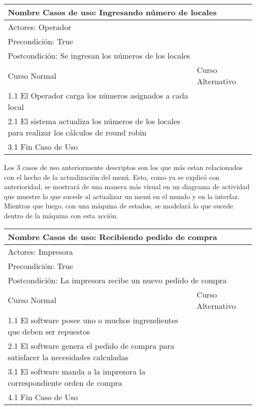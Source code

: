 \documentclass[a4paper,10pt]{article}
\begin{document}
\bigskip

\begin{center}
\begin{tabularx}{14cm}{|X|X|}
\hline
\multicolumn{2}{|l|}{Nombre Casos de uso: Ingresando n\'umero de locales}\\
\hline
\multicolumn{2}{|l|}{Actores: Operador}\\
\hline
\multicolumn{2}{|l|}{Precondici\'on: True}\\
\hline
\multicolumn{2}{|l|}{Postcondici\'on: Se ingresan los n\'umeros de los locales}\\
\hline
Curso Normal & Curso Alternativo\\
\hline
1.1 El Operador carga los n\'umeros asignados a cada local & 
\\
\hline
2.1 El sistema actualiza los n\'umeros de los locales para realizar los c\'alculos de round robin & 
\\
\hline
3.1 Fin Caso de Uso &
\\
\hline
\end{tabularx}
\end{center}

\bigskip

Los 3 casos de uso anteriormente descriptos son los que m\'as estan relacionados con el hecho de la actualizaci\'on del men\'u. Esto, como ya se
explic\'o con anterioridad, se mostrar\'a de una manera m\'as visual en un diagrama de actividad que muestre lo que sucede al actualizar un men\'u
en el mundo y en la interfaz. Mientras que luego, con una m\'aquina de estados, se modelar\'a lo que sucede dentro de la m\'aquina con esta acci\'on.

\bigskip

\begin{center}
\begin{tabularx}{14cm}{|X|X|}
\hline
\multicolumn{2}{|l|}{Nombre Casos de uso: Recibiendo pedido de compra}\\
\hline
\multicolumn{2}{|l|}{Actores: Impresora}\\
\hline
\multicolumn{2}{|l|}{Precondici\'on: True}\\
\hline
\multicolumn{2}{|l|}{Postcondici\'on: La impresora recibe un nuevo pedido de compra}\\
\hline
Curso Normal & Curso Alternativo\\
\hline
1.1 El software posee uno o muchos ingrendientes que deben ser repuestos & 
\\
\hline
2.1 El software genera el pedido de compra para satisfacer la necesidades calculadas & 
\\
\hline
3.1 El software manda a la impresora la correspondiente orden de compra &
\\
\hline
4.1 Fin Caso de Uso &
\\
\hline
\end{tabularx}
\end{center}
\end{document}
